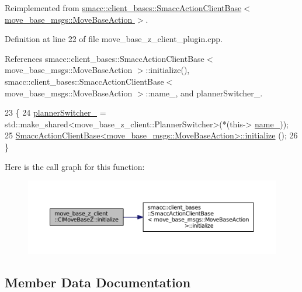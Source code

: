 Reimplemented from \hyperlink{classsmacc_1_1client__bases_1_1SmaccActionClientBase_a72967f255f85e35718a1e1b0b48c38ff}{smacc\+::client\+\_\+bases\+::\+Smacc\+Action\+Client\+Base$<$ move\+\_\+base\+\_\+msgs\+::\+Move\+Base\+Action $>$}.



Definition at line 22 of file move\+\_\+base\+\_\+z\+\_\+client\+\_\+plugin.\+cpp.



References smacc\+::client\+\_\+bases\+::\+Smacc\+Action\+Client\+Base$<$ move\+\_\+base\+\_\+msgs\+::\+Move\+Base\+Action $>$\+::initialize(), smacc\+::client\+\_\+bases\+::\+Smacc\+Action\+Client\+Base$<$ move\+\_\+base\+\_\+msgs\+::\+Move\+Base\+Action $>$\+::name\+\_\+, and planner\+Switcher\+\_\+.


\begin{DoxyCode}
23 \{
24     \hyperlink{classmove__base__z__client_1_1ClMoveBaseZ_ac57d2293bc0a5c4fcef326379822cc5e}{plannerSwitcher\_} = std::make\_shared<move\_base\_z\_client::PlannerSwitcher>(*(this->
      \hyperlink{classsmacc_1_1client__bases_1_1SmaccActionClientBase_a12b007d3c3657b0f0699e97cdb96a490}{name\_}));
25     \hyperlink{classsmacc_1_1client__bases_1_1SmaccActionClientBase_a72967f255f85e35718a1e1b0b48c38ff}{SmaccActionClientBase<move\_base\_msgs::MoveBaseAction>::initialize}
      ();
26 \}
\end{DoxyCode}


Here is the call graph for this function\+:
\nopagebreak
\begin{figure}[H]
\begin{center}
\leavevmode
\includegraphics[width=350pt]{classmove__base__z__client_1_1ClMoveBaseZ_a082cef8bf5dbd0ec06adfe2a7aefbf70_cgraph}
\end{center}
\end{figure}




\subsection{Member Data Documentation}
